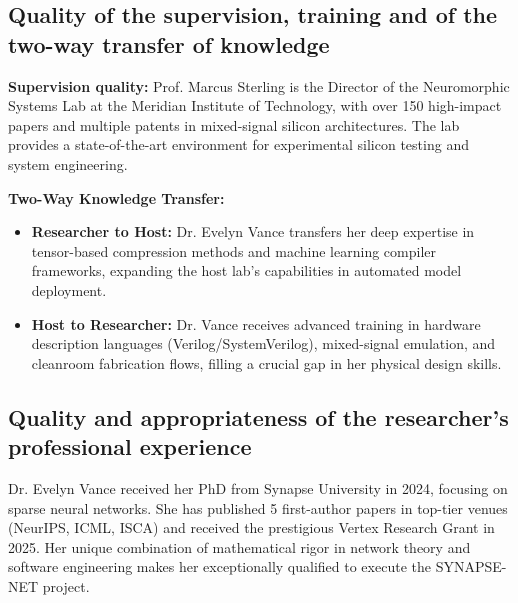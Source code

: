 \subsection{Quality of the supervision, training and of the two-way transfer of knowledge}
\textbf{Supervision quality:} Prof. Marcus Sterling is the Director of the Neuromorphic Systems Lab at the Meridian Institute of Technology, with over 150 high-impact papers and multiple patents in mixed-signal silicon architectures. The lab provides a state-of-the-art environment for experimental silicon testing and system engineering.
\par
\textbf{Two-Way Knowledge Transfer:}
\begin{itemize}[leftmargin=*]
  \item \textbf{Researcher to Host:} Dr. Evelyn Vance transfers her deep expertise in tensor-based compression methods and machine learning compiler frameworks, expanding the host lab's capabilities in automated model deployment.
  \item \textbf{Host to Researcher:} Dr. Vance receives advanced training in hardware description languages (Verilog/SystemVerilog), mixed-signal emulation, and cleanroom fabrication flows, filling a crucial gap in her physical design skills.
\end{itemize}

\subsection{Quality and appropriateness of the researcher's professional experience}
Dr. Evelyn Vance received her PhD from Synapse University in 2024, focusing on sparse neural networks. She has published 5 first-author papers in top-tier venues (NeurIPS, ICML, ISCA) and received the prestigious Vertex Research Grant in 2025. Her unique combination of mathematical rigor in network theory and software engineering makes her exceptionally qualified to execute the SYNAPSE-NET project.

\newpage
